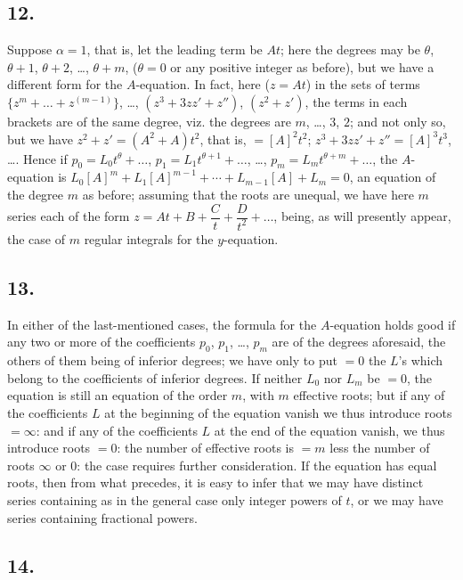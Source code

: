 \documentclass[11pt,a4paper]{book}
\begin{document}
\subsection*{12.}

Suppose $\alpha = 1$, that is, let the leading term be $At$; here the degrees may be $\theta$, $\theta + 1$, $\theta + 2$, \ldots, $\theta + m$, ($\theta = 0$ or any positive integer as before), but we have a different form for the $A$-equation. In fact, here ($z = At$) in the sets of terms $\{z^m + \ldots + z^{(m-1)}\}$, \ldots, $(z^3 + 3zz' + z'')$, $(z^2 + z')$, the terms in each brackets are of the same degree, viz. the degrees are $m$, \ldots, $3$, $2$; and not only so, but we have $z^2 + z' = (A^2 + A)t^2$, that is, $= [A]^2 t^2$; $z^3 + 3zz' + z'' = [A]^3 t^3$, \ldots. Hence if $p_0 = L_0 t^\theta + \ldots$, $p_1 = L_1 t^{\theta + 1} + \ldots$, \ldots, $p_m = L_m t^{\theta + m} + \ldots$, the $A$-equation is $L_0 [A]^m + L_1 [A]^{m-1} + \cdots + L_{m-1}[A] + L_m = 0$, an equation of the degree $m$ as before; assuming that the roots are unequal, we have here $m$ series each of the form $z = At + B + \dfrac{C}{t} + \dfrac{D}{t^2} + \ldots$, being, as will presently appear, the case of $m$ regular integrals for the $y$-equation.

\subsection*{13.}

In either of the last-mentioned cases, the formula for the $A$-equation holds good if any two or more of the coefficients $p_0$, $p_1$, \ldots, $p_m$ are of the degrees aforesaid, the others of them being of inferior degrees; we have only to put $= 0$ the $L$'s which belong to the coefficients of inferior degrees. If neither $L_0$ nor $L_m$ be $= 0$, the equation is still an equation of the order $m$, with $m$ effective roots; but if any of the coefficients $L$ at the beginning of the equation vanish we thus introduce roots $= \infty$: and if any of the coefficients $L$ at the end of the equation vanish, we thus introduce roots $= 0$: the number of effective roots is $= m$ less the number of roots $\infty$ or $0$: the case requires further consideration. If the equation has equal roots, then from what precedes, it is easy to infer that we may have distinct series containing as in the general case only integer powers of $t$, or we may have series containing fractional powers.

\subsection*{14.}
\end{document}
